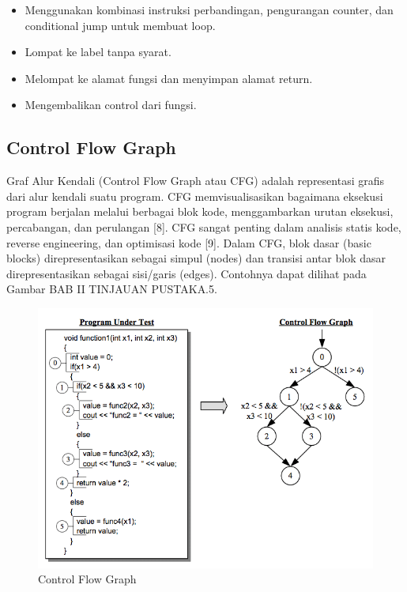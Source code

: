 \begin{itemize}
	\item Menggunakan kombinasi instruksi perbandingan, pengurangan counter, dan conditional jump untuk membuat loop.
\end{itemize}

\begin{itemize}
	\item {} Lompat ke label tanpa syarat.
\end{itemize}

\begin{itemize}
	\item {} Melompat ke alamat fungsi dan menyimpan alamat return.
	\item {} Mengembalikan control dari fungsi.
\end{itemize}

\subsection{Control Flow Graph}
Graf Alur Kendali (Control Flow Graph atau CFG) adalah representasi grafis dari alur kendali suatu program. CFG memvisualisasikan bagaimana eksekusi program berjalan melalui berbagai blok kode, menggambarkan urutan eksekusi, percabangan, dan perulangan [8]. CFG sangat penting dalam analisis statis kode, reverse engineering, dan optimisasi kode [9]. Dalam CFG, blok dasar (basic blocks) direpresentasikan sebagai simpul (nodes) dan transisi antar blok dasar direpresentasikan sebagai sisi/garis (edges). Contohnya dapat dilihat pada Gambar BAB II TINJAUAN PUSTAKA.5.

\begin{figure}
	\centering
	\includegraphics[width=1\textwidth]
	{assets/pics/control_flow_graph.png}
	\caption{Control Flow Graph}
\end{figure}

